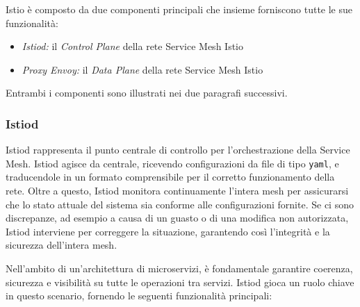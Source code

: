 Istio è composto da due componenti principali che insieme forniscono tutte le sue funzionalità:
\begin{itemize}
    \item \textit{Istiod:} il \textit{Control Plane} della rete Service Mesh Istio
    \item \textit{Proxy Envoy:} il \textit{Data Plane} della rete Service Mesh Istio
\end{itemize}

Entrambi i componenti sono illustrati nei due paragrafi successivi.

\subsubsection{Istiod}

Istiod rappresenta il punto centrale di controllo per l'orchestrazione della Service Mesh. 
Istiod agisce da  centrale, ricevendo configurazioni da file di tipo \texttt{yaml}, e traducendole in un formato comprensibile per il corretto funzionamento della rete. Oltre a questo, Istiod monitora continuamente l'intera mesh per assicurarsi che lo stato attuale del sistema sia conforme alle configurazioni fornite. Se ci sono discrepanze, ad esempio a causa di un guasto o di una modifica non autorizzata, Istiod interviene per correggere la situazione, garantendo così l'integrità e la sicurezza dell'intera mesh.

Nell'ambito di un'architettura di microservizi, è fondamentale garantire coerenza, sicurezza e visibilità su tutte le operazioni tra servizi. Istiod gioca un ruolo chiave in questo scenario, fornendo le seguenti funzionalità principali:

